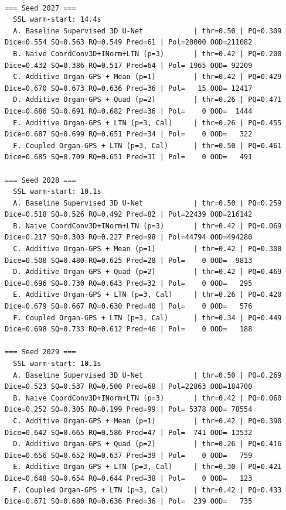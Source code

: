 \documentclass[10pt,a4paper]{article}
\renewcommand{\_}{\origunderscore\allowbreak}
\begin{document}
\begin{outbox}
\begin{lstlisting}[style=outbmedwide]

=== Seed 2027 ===
  SSL warm-start: 14.4s
  A. Baseline Supervised 3D U-Net            | thr=0.50 | PQ=0.309 Dice=0.554 SQ=0.563 RQ=0.549 Pred=61 | Pol=20000 OOD=211082
  B. Naive CoordConv3D+INorm+LTN (p=3)       | thr=0.42 | PQ=0.200 Dice=0.432 SQ=0.386 RQ=0.517 Pred=64 | Pol= 1965 OOD= 92209
  C. Additive Organ-GPS + Mean (p=1)         | thr=0.42 | PQ=0.429 Dice=0.670 SQ=0.673 RQ=0.636 Pred=36 | Pol=   15 OOD= 12417
  D. Additive Organ-GPS + Quad (p=2)         | thr=0.26 | PQ=0.471 Dice=0.686 SQ=0.691 RQ=0.682 Pred=36 | Pol=    0 OOD=  1444
  E. Additive Organ-GPS + LTN (p=3, Cal)     | thr=0.26 | PQ=0.455 Dice=0.687 SQ=0.699 RQ=0.651 Pred=34 | Pol=    0 OOD=   322
  F. Coupled Organ-GPS + LTN (p=3, Cal)      | thr=0.50 | PQ=0.461 Dice=0.685 SQ=0.709 RQ=0.651 Pred=31 | Pol=    0 OOD=   491

=== Seed 2028 ===
  SSL warm-start: 10.1s
  A. Baseline Supervised 3D U-Net            | thr=0.50 | PQ=0.259 Dice=0.518 SQ=0.526 RQ=0.492 Pred=82 | Pol=22439 OOD=216142
  B. Naive CoordConv3D+INorm+LTN (p=3)       | thr=0.42 | PQ=0.069 Dice=0.217 SQ=0.303 RQ=0.227 Pred=98 | Pol=44794 OOD=494280
  C. Additive Organ-GPS + Mean (p=1)         | thr=0.42 | PQ=0.300 Dice=0.508 SQ=0.480 RQ=0.625 Pred=28 | Pol=    0 OOD=  9813
  D. Additive Organ-GPS + Quad (p=2)         | thr=0.42 | PQ=0.469 Dice=0.696 SQ=0.730 RQ=0.643 Pred=32 | Pol=    0 OOD=   295
  E. Additive Organ-GPS + LTN (p=3, Cal)     | thr=0.26 | PQ=0.420 Dice=0.679 SQ=0.667 RQ=0.630 Pred=40 | Pol=    0 OOD=   576
  F. Coupled Organ-GPS + LTN (p=3, Cal)      | thr=0.34 | PQ=0.449 Dice=0.698 SQ=0.733 RQ=0.612 Pred=46 | Pol=    0 OOD=   188

=== Seed 2029 ===
  SSL warm-start: 10.1s
  A. Baseline Supervised 3D U-Net            | thr=0.50 | PQ=0.269 Dice=0.523 SQ=0.537 RQ=0.500 Pred=68 | Pol=22863 OOD=184700
  B. Naive CoordConv3D+INorm+LTN (p=3)       | thr=0.42 | PQ=0.060 Dice=0.252 SQ=0.305 RQ=0.199 Pred=99 | Pol= 5378 OOD= 78554
  C. Additive Organ-GPS + Mean (p=1)         | thr=0.42 | PQ=0.390 Dice=0.642 SQ=0.665 RQ=0.586 Pred=47 | Pol=  741 OOD= 13532
  D. Additive Organ-GPS + Quad (p=2)         | thr=0.26 | PQ=0.416 Dice=0.656 SQ=0.652 RQ=0.637 Pred=39 | Pol=    0 OOD=   759
  E. Additive Organ-GPS + LTN (p=3, Cal)     | thr=0.30 | PQ=0.421 Dice=0.648 SQ=0.654 RQ=0.644 Pred=38 | Pol=    0 OOD=   123
  F. Coupled Organ-GPS + LTN (p=3, Cal)      | thr=0.42 | PQ=0.433 Dice=0.671 SQ=0.680 RQ=0.636 Pred=36 | Pol=  239 OOD=   735
\end{lstlisting}
\end{outbox}
\end{document}
